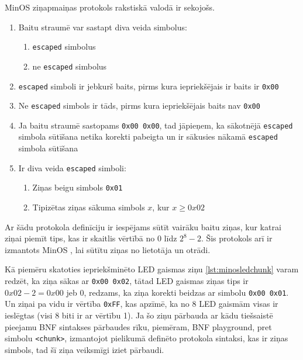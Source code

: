 MinOS ziņapmaiņas protokols rakstiskā valodā ir sekojošs.
\begin{enumerate}
    \item Baitu straumē var sastapt diva veida simbolus:
    \begin{enumerate}
        \item \lstinline!escaped! simbolus
        \item ne \lstinline!escaped! simbolus
    \end{enumerate}
    \item \lstinline!escaped! simboli ir jebkurš baits, pirms kura iepriekšējais ir baits ir \lstinline!0x00!
    \item Ne \lstinline!escaped! simbols ir tāds, pirms kura iepriekšējais baits nav \lstinline!0x00!
    \item Ja baitu straumē sastopams \lstinline!0x00 0x00!, tad jāpieņem, ka
        sākotnējā \lstinline!escaped! simbola sūtīšana netika korekti pabeigta
        un ir sākusies nākamā \lstinline!escaped! simbola sūtīšana
    \item Ir diva veida \lstinline!escaped! simboli: 
    \begin{enumerate}
        \item Ziņas beigu simbols \lstinline!0x01!
        \item Tipizētas ziņas sākuma simbols \(x\), kur \(x\geq0x02\)
    \end{enumerate}
\end{enumerate}

Ar šādu protokola definīciju ir iespējams sūtīt vairāku baitu ziņas, kur katrai
ziņai piemīt tips, kas ir skaitlis vērtībā no \(0\) līdz \(2^8-2\). Šis
protokols arī ir izmantots MinOS , lai sūtītu
ziņas no lietotāja  un otrādi. 

Kā piemēru skatoties iepriekšminēto LED gaismas ziņu \ref{lst:minosledchunk}
varam redzēt, ka ziņa sākas ar \lstinline!0x00 0x02!, tātad LED gaismas ziņas
tips ir \(0x02 - 2 = 0x00\) jeb \(0\), redzams, ka ziņa korekti beidzas ar
simbolu \lstinline!0x00 0x01!. Un ziņai pa vidu ir vērtība \lstinline!0xFF!, kas
apzīmē, ka no 8 LED gaismām visas ir ieslēgtas (visi 8 biti ir ar vērtību 1). Ja
šo ziņu pārbauda ar kādu tiešsaistē pieejamu BNF sintakses pārbaudes rīku,
piemēram, BNF playground, \cite{BNFPlayground} pret simbolu \lstinline!<chunk>!,
izmantojot pielikumā definēto protokola sintaksi, kas ir ziņas simbols, tad šī
ziņa veiksmīgi iziet pārbaudi.

